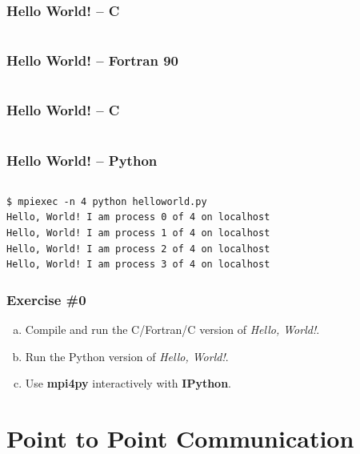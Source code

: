 \documentclass{beamer}
\newcommand{\Cpp}{C\protect\raisebox{.18ex}{++}\xspace}
\begin{document}
\begin{frame}[fragile]
  \frametitle{Hello World! -- C}
  \inputminted[linenos]{c}{helloworld.c}
\end{frame}

\begin{frame}[fragile]
  \frametitle{Hello World! -- Fortran 90}
  \inputminted[linenos]{fortran}{helloworld.f90}
\end{frame}

\begin{frame}[fragile]
  \frametitle{Hello World! -- \Cpp}
  \inputminted[linenos]{cpp}{helloworld.cxx}
\end{frame}

\begin{frame}[fragile]
  \frametitle{Hello World! -- Python}
  \inputminted[linenos]{python}{helloworld.py}
  \begin{block}{}
\begin{verbatim}
$ mpiexec -n 4 python helloworld.py
Hello, World! I am process 0 of 4 on localhost
Hello, World! I am process 1 of 4 on localhost
Hello, World! I am process 2 of 4 on localhost
Hello, World! I am process 3 of 4 on localhost
\end{verbatim}
  \end{block}
\end{frame}

\begin{frame}
  \frametitle{Exercise \#0}
  \begin{enumerate}[a)]
  \item Compile and run the C/Fortran/\Cpp version of \emph{Hello, World!}.
  \item Run the Python version of \emph{Hello, World!}.
  \item Use \textbf{mpi4py} interactively with \textbf{IPython}.
  \end{enumerate}
\end{frame}


\section{Point to Point Communication}
\end{document}
